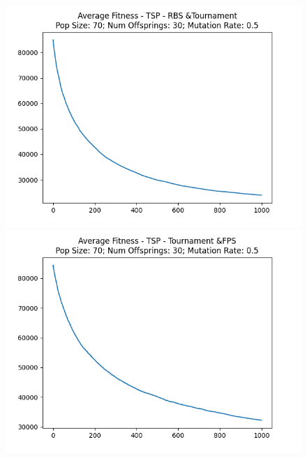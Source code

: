 \documentclass[12pt]{report}
\theoremstyle{mytheoremstyle}
\theoremstyle{mytheoremstyle}
\theoremstyle{myproblemstyle}
\begin{document}
\begin{figure}[!]
\begin{minipage}{0.4\textwidth}
	\end{minipage}
	\vspace*{1cm}
	\begin{minipage}{0.4\textwidth}
		\includegraphics[width=\linewidth]{../Analysis/ASF_TSP_1_2_70_30.png}
	\end{minipage}
	\hspace{\fill}
	\begin{minipage}{0.4\textwidth}
		\includegraphics[width=\linewidth]{../Analysis/ASF_TSP_2_0_70_30.png}
	\end{minipage}
	\vspace*{1cm}
	\begin{minipage}{0.4\textwidth}

\end{minipage}
\end{figure}
\end{document}
